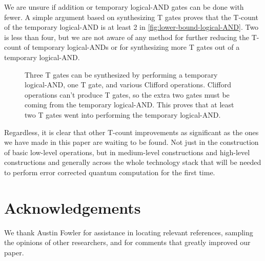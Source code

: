 \documentclass{quantumarticle-customized}
\newcommand{\qT}{\gate{T}}
\newcommand{\qS}{\gate{S}}
\begin{document}
We are unsure if addition or temporary logical-AND gates can be done with fewer.
A simple argument based on synthesizing T gates proves that the T-count of the temporary logical-AND is at least 2 in \autoref{fig:lower-bound-logical-AND}.
Two is less than four, but we are not aware of any method for further reducing the T-count of temporary logical-ANDs or for synthesizing more T gates out of a temporary logical-AND.

\begin{figure}
  \resizebox{\linewidth}{!}{
    \Qcircuit @R=0.7em @C=0.7em {
      &\qT &\qw && &&&\ctrl{2}&\qw     &\ctrl{3}&\qw     &\qw &\qw     &\ctrl{3}&\qw     &\ctrl{2}&\qw &\\
      &\qT &\qw &&=&&&\targ   &\ctrl{1}&\qw     &\ctrl{1}&\qw &\ctrl{1}&\qw     &\ctrl{1}&\targ   &\qw &\\
      &\qT &\qw && &&&\targ   &\ctrl{1}&\targ   &\targ   &\qT &\targ   &\targ   &\ctrl{1}&\targ   &\qw &\\
      &    &    && &&&        &        &\targ   &\qw     &\qS &\qw     &\targ   &\qw     &        &    &\\
    }
  }
  \caption{
	Three T gates can be synthesized by performing a temporary logical-AND, one T gate, and various Clifford operations.
	Clifford operations can't produce T gates, so the extra two gates must be coming from the temporary logical-AND.
	This proves that at least two T gates went into performing the temporary logical-AND.
  }
  \label{fig:lower-bound-logical-AND}
\end{figure}

Regardless, it is clear that other T-count improvements as significant as the ones we have made in this paper are waiting to be found.
Not just in the construction of basic low-level operations, but in medium-level constructions and high-level constructions and generally across the whole technology stack that will be needed to perform error corrected quantum computation for the first time.


\section{Acknowledgements}

We thank Austin Fowler for assistance in locating relevant references, sampling the opinions of other researchers, and for comments that greatly improved our paper.




\end{document}
